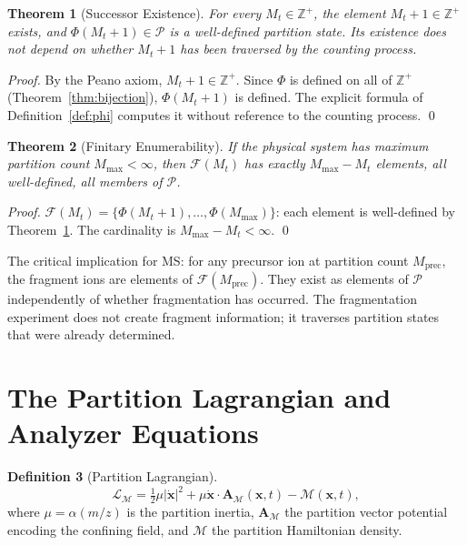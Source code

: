 \documentclass[twocolumn,10pt,a4paper]{article}
\theoremstyle{thmstyle}
\newtheorem{theorem}{Theorem}[section]
\theoremstyle{definition}
\newtheorem{definition}[theorem]{Definition}
\theoremstyle{remark}
\newcommand{\Zp}{\mathbb{Z}^{+}}
\newcommand{\Parts}{\mathcal{P}}
\newcommand{\PhiMap}{\varPhi}
\newcommand{\Mmax}{M_{\max}}
\newcommand{\LM}{\mathcal{L}_{\mathcal{M}}}
\newcommand{\AM}{\mathbf{A}_{\mathcal{M}}}
\newcommand{\Mop}{\mathcal{M}}
\newcommand{\calF}{\mathcal{F}}
\begin{document}
\begin{theorem}[Successor Existence]
\label{thm:successor}
For every $M_t \in \Zp$, the element $M_t + 1 \in \Zp$ exists, and
$\PhiMap(M_t + 1) \in \Parts$ is a well-defined partition state. Its
existence does not depend on whether $M_t + 1$ has been traversed by
the counting process.
\end{theorem}

\begin{proof}
By the Peano axiom, $M_t + 1 \in \Zp$. Since $\PhiMap$ is defined on
all of $\Zp$ (Theorem~\ref{thm:bijection}), $\PhiMap(M_t + 1)$ is
defined. The explicit formula of Definition~\ref{def:phi} computes it
without reference to the counting process. \qed
\end{proof}

\begin{theorem}[Finitary Enumerability]
\label{thm:finite}
If the physical system has maximum partition count $\Mmax < \infty$,
then $\calF(M_t)$ has exactly $\Mmax - M_t$ elements, all
well-defined, all members of $\Parts$.
\end{theorem}

\begin{proof}
$\calF(M_t) = \{\PhiMap(M_t+1), \ldots, \PhiMap(\Mmax)\}$:
each element is well-defined by Theorem~\ref{thm:successor}.
The cardinality is $\Mmax - M_t < \infty$. \qed
\end{proof}

The critical implication for MS: for any precursor ion at partition
count $M_{\text{prec}}$, the fragment ions are elements of
$\calF(M_{\text{prec}})$. They exist as elements of $\Parts$
independently of whether fragmentation has occurred. The fragmentation
experiment does not create fragment information; it traverses partition
states that were already determined.

\section{The Partition Lagrangian and Analyzer Equations}
\label{sec:lagrangian}

\begin{definition}[Partition Lagrangian]
\label{def:lagrangian}
\begin{equation}
\LM = \tfrac{1}{2}\mu|\dot{\mathbf{x}}|^2
+ \mu\dot{\mathbf{x}}\cdot\AM(\mathbf{x},t)
- \Mop(\mathbf{x},t),
\label{eq:lagrangian}
\end{equation}
where $\mu = \alpha(m/z)$ is the partition inertia, $\AM$ the partition
vector potential encoding the confining field, and $\Mop$ the partition
Hamiltonian density.
\end{definition}
\end{document}
